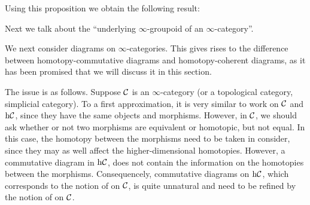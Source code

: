 Using this proposition we obtain the following result:


Next we talk about the ``underlying $\infty$-groupoid of an $\infty$-category''.


We next consider diagrams on $\infty$-categories. This gives rises to the difference between homotopy-commutative diagrams
and homotopy-coherent diagrams, as it has been promised that we will discuss it in this section. 

The issue is as follows. Suppose $\mathcal{C}$ is an $\infty$-category (or a topological category, simplicial category). To a first approximation,
it is very similar to work on $\mathcal{C}$ and $\mathrm{h}\mathcal{C}$, since they have the same objects and morphisms. However, in $\mathcal{C}$, we should ask
whether or not two morphisms are equivalent or homotopic, but not equal. In this case, the homotopy between the morphisms need to
be taken in consider, since they may as well affect the higher-dimensional homotopies. However, a commutative diagram in $\mathrm{h}\mathcal{C}$,
does not contain the information on the homotopies between the morphisms. Consequencely, commutative diagrams on $\mathrm{h}\mathcal{C}$, which corresponds
to the notion of  on $\mathcal{C}$, is quite unnatural and need to be refined by the notion of
 on $\mathcal{C}$.

